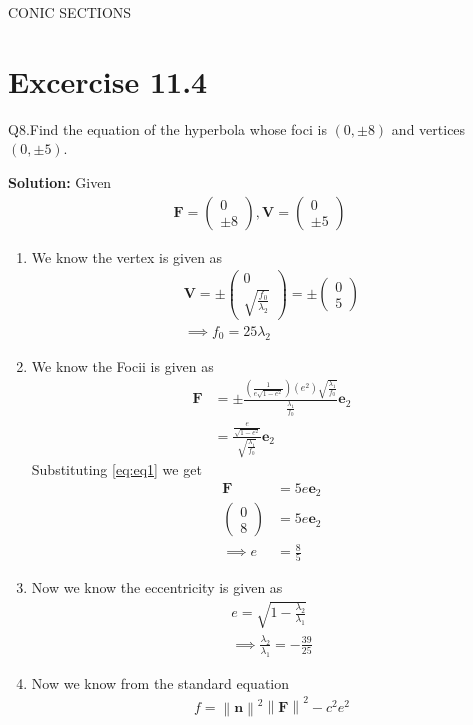 \documentclass[12pt]{article}
\providecommand{\brak}[1]{\ensuremath{\left(#1\right)}}
\providecommand{\norm}[1]{\left\lVert#1\right\rVert}
\newcommand{\solution}{\noindent \textbf{Solution: }}
\newcommand{\myvec}[1]{\ensuremath{\begin{pmatrix}#1\end{pmatrix}}}
\let\vec\mathbf
\begin{document}
\begin{center}
\textbf\large{CONIC SECTIONS}

\end{center}
\section*{Excercise 11.4}
Q8.Find the equation of the hyperbola whose foci is $\brak{0,\pm 8}$ and vertices $\brak{0,\pm 5}$.

\solution
Given
\begin{align}
	\vec{F} = \myvec{0\\\pm 8}, \vec{V} = \myvec{0\\\pm 5} 
\end{align}
\begin{enumerate}
\item We know the vertex is given as
\begin{align}
	\vec{V} = \pm\myvec{0\\\sqrt{\frac{f_0}{\lambda_2}}} = \pm\myvec{0\\5}\\
	\label{eq:eq1}
	\implies f_0 = 25\lambda_2
\end{align}
\item We know the Focii is given as
\begin{align}
	\vec{F} &= \pm \frac{\brak{\frac{1}{e\sqrt{1-e^2}}}\brak{e^2}\sqrt{\frac{\lambda_1}{f_0}}}{\frac{\lambda_1}{f_0}}\vec{e}_2\\
	        &= \frac{\frac{e}{\sqrt{1-e^2}}}{\sqrt{\frac{\lambda_1}{f_0}}}\vec{e}_2
\end{align}
Substituting \eqref{eq:eq1} we get
\begin{align}
	\vec{F} &= 5e\vec{e}_2\\
	\myvec{0\\8} &= 5e\vec{e}_2\\
	\implies e &= \frac{8}{5}
\end{align}
\item Now we know the eccentricity is given as
\begin{align}
	e = \sqrt{1-\frac{\lambda_2}{\lambda_1}}\\
	\label{eq:eq2}
	\implies \frac{\lambda_2}{\lambda_1} = -\frac{39}{25}
\end{align}
\item Now we know from the standard equation
\begin{align}
	\label{eq:eq3}
	f = \norm{\vec{n}}^2 \norm{\vec{F}}^2 - c^2 e^2
\end{align}

\end{enumerate}
\end{document}
